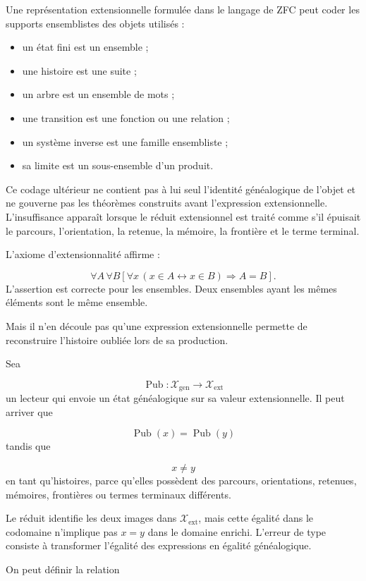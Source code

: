 Une représentation extensionnelle formulée dans le langage de ZFC peut coder les supports ensemblistes des objets utilisés :\par
\begin{itemize}
\item un état fini est un ensemble ;
\item une histoire est une suite ;
\item un arbre est un ensemble de mots ;
\item une transition est une fonction ou une relation ;
\item un système inverse est une famille ensembliste ;
\item sa limite est un sous-ensemble d’un produit.
\end{itemize}
Ce codage ultérieur ne contient pas à lui seul l’identité généalogique de l’objet et ne gouverne pas les théorèmes construits avant l’expression extensionnelle. L’insuffisance apparaît lorsque le réduit extensionnel est traité comme s’il épuisait le parcours, l’orientation, la retenue, la mémoire, la frontière et le terme terminal.\par
L’axiome d’extensionnalité affirme :\par
\[
\forall A\,\forall B
\left[
\forall x\,
(x\in A\leftrightarrow x\in B)
\Rightarrow A=B
\right].
\]
L’assertion est correcte pour les ensembles. Deux ensembles ayant les mêmes éléments sont le même ensemble.\par
Mais il n’en découle pas qu’une expression extensionnelle permette de reconstruire l’histoire oubliée lors de sa production.\par
Sea\par
\[
\operatorname{Pub}:
\mathscr X_{\mathrm{gen}}
\longrightarrow
\mathscr X_{\mathrm{ext}}
\]
un lecteur qui envoie un état généalogique sur sa valeur extensionnelle. Il peut arriver que\par
\[
\operatorname{Pub}(x)
=
\operatorname{Pub}(y)
\]
tandis que\par
\[
x\neq y
\]
en tant qu’histoires, parce qu’elles possèdent des parcours, orientations, retenues, mémoires, frontières ou termes terminaux différents.\par
Le réduit identifie les deux images dans \(\mathscr X_{\mathrm{ext}}\), mais cette égalité dans le codomaine n’implique pas \(x=y\) dans le domaine enrichi. L’erreur de type consiste à transformer l’égalité des expressions en égalité généalogique.\par
On peut définir la relation\par
